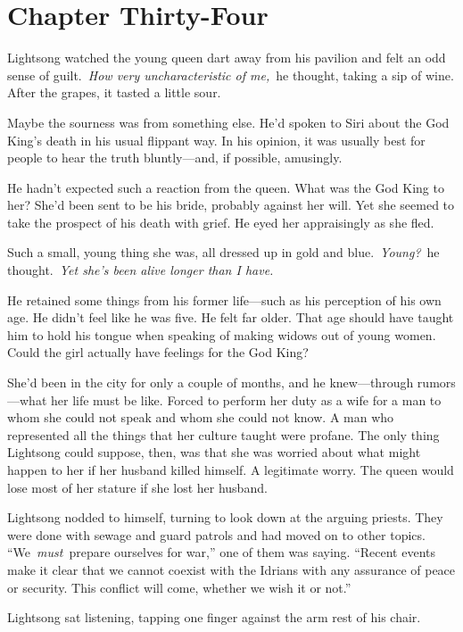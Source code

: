 \section{Chapter Thirty-Four}

Lightsong watched the young queen dart away from his pavilion and felt an odd sense of guilt.~\textit{How very uncharacteristic of me,}~he thought, taking a sip of wine. After the grapes, it tasted a little sour.

Maybe the sourness was from something else. He’d spoken to Siri about the God King’s death in his usual flippant way. In his opinion, it was usually best for people to hear the truth bluntly—and, if possible, amusingly.

He hadn’t expected such a reaction from the queen. What was the God King to her? She’d been sent to be his bride, probably against her will. Yet she seemed to take the prospect of his death with grief. He eyed her appraisingly as she fled.

Such a small, young thing she was, all dressed up in gold and blue.~\textit{Young?}~he thought.~\textit{Yet she’s been alive longer than I have.}

He retained some things from his former life—such as his perception of his own age. He didn’t feel like he was five. He felt far older. That age should have taught him to hold his tongue when speaking of making widows out of young women. Could the girl actually have feelings for the God King?

She’d been in the city for only a couple of months, and he knew—through rumors—what her life must be like. Forced to perform her duty as a wife for a man to whom she could not speak and whom she could not know. A man who represented all the things that her culture taught were profane. The only thing Lightsong could suppose, then, was that she was worried about what might happen to her if her husband killed himself. A legitimate worry. The queen would lose most of her stature if she lost her husband.

Lightsong nodded to himself, turning to look down at the arguing priests. They were done with sewage and guard patrols and had moved on to other topics. “We~\textit{must}~prepare ourselves for war,” one of them was saying. “Recent events make it clear that we cannot coexist with the Idrians with any assurance of peace or security. This conflict will come, whether we wish it or not.”

Lightsong sat listening, tapping one finger against the arm rest of his chair.

